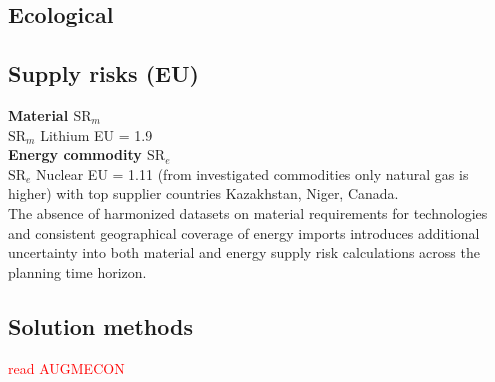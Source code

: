     \subsection{Ecological} 
    \label{subsec_ecological_sota}

    \subsection{Supply risks (EU)} 
    \label{subsec_supply_risks_sota}
    \textbf{Material $\text{SR}_{m}$}\\
    $\text{SR}_{m}$ Lithium EU = 1.9 \cite{colucciCombinedAssessmentMaterial2025}\\
    \textbf{Energy commodity $\text{SR}_{e}$}\\
    $\text{SR}_{e}$ Nuclear EU = 1.11 (from investigated commodities only natural gas is higher) with top supplier countries Kazakhstan, Niger, Canada. \cite{colucciCombinedAssessmentMaterial2025}\\

    The absence of harmonized datasets on material requirements for technologies and consistent geographical coverage of energy imports introduces additional uncertainty into both material and energy supply risk calculations across the planning time horizon. \cite{colucciCombinedAssessmentMaterial2025}

    \subsection{Solution methods}
    \label{subsec_solution_methods}
    \textcolor{red}{read \cite{farajiamiriMultiobjectiveOptimizationRenewable2023} \cite{colucciCombinedAssessmentMaterial2025} AUGMECON}